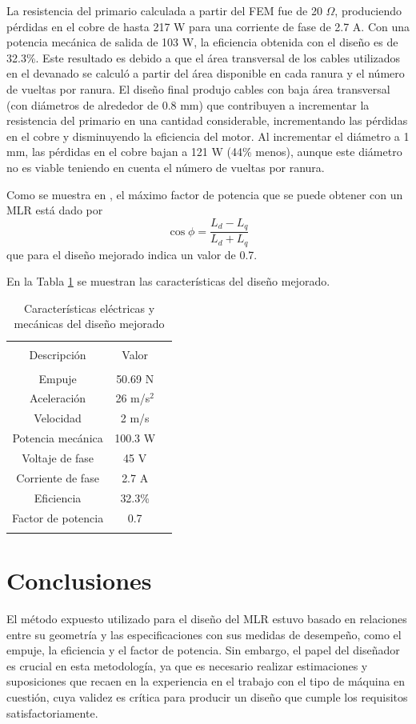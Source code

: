 La resistencia del primario calculada a partir del FEM fue de 20 $\Omega$, produciendo pérdidas en el cobre de hasta 217 W para una corriente de fase de 2.7 A. Con una potencia mecánica de salida de 103 W, la eficiencia obtenida con el diseño es de 32.3\%. Este resultado es debido a que el área transversal de los cables utilizados en el devanado se calculó a partir del área disponible en cada ranura y el número de vueltas por ranura. El diseño final produjo cables con baja área transversal (con diámetros de alrededor de 0.8 mm) que contribuyen a incrementar la resistencia del primario en una cantidad considerable, incrementando las pérdidas en el cobre y disminuyendo la eficiencia del motor. Al incrementar el diámetro a 1 mm, las pérdidas en el cobre bajan a 121 W (44\% menos), aunque este diámetro no es viable teniendo en cuenta el número de vueltas por ranura.

Como se muestra en \cite{mirzaei2008,boldea2013}, el máximo factor de potencia que se puede obtener con un MLR está dado por
\begin{equation}
\cos\phi = \frac{L_d-L_q}{L_d+L_q}
\end{equation}
que para el diseño mejorado indica un valor de 0.7. 

En la Tabla \ref{table:electmechparamsfinal} se muestran las características del diseño mejorado.

\begin{table}[t]
\centering
\caption{Características eléctricas y mecánicas del diseño mejorado}
\label{table:electmechparamsfinal}
\begin{tabular}{c c c}
\hline\hline\\
Descripción & Valor \\
\hline\\
Empuje & 50.69 N\\
Aceleración & 26 m/s$^2$\\
Velocidad & 2 m/s\\
Potencia mecánica & 100.3 W\\
Voltaje de fase & 45 V\\
Corriente de fase & 2.7 A\\
Eficiencia & 32.3\%\\
Factor de potencia & 0.7\\ %
\hline\hline\\
\end{tabular}
\end{table}

\section{Conclusiones}
El método expuesto utilizado para el diseño del MLR estuvo basado en relaciones entre su geometría y las especificaciones con sus medidas de desempeño, como el empuje, la eficiencia y el factor de potencia. Sin embargo, el papel del diseñador es crucial en esta metodología, ya que es necesario realizar estimaciones y suposiciones que recaen en la experiencia en el trabajo con el tipo de máquina en cuestión, cuya validez es crítica para producir un diseño que cumple los requisitos satisfactoriamente. 


